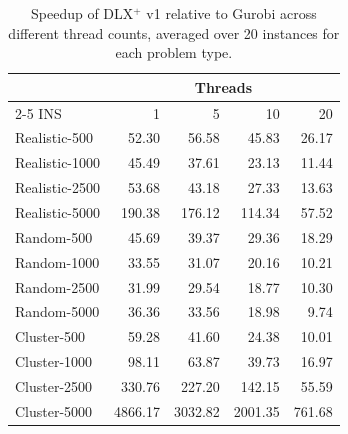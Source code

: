 \begin{table}[ht]
\centering
\caption{Speedup of DLX$^+$ v1 relative to Gurobi across different thread counts, averaged over 20 instances for each problem type.}
\label{tab:dlx_parallelisation_speedup}
\begin{tabular}{lrrrr}
\toprule
& \multicolumn{4}{c}{Threads} \\
\cmidrule(lr){2-5}
INS & 1 & 5 & 10 & 20 \\
\midrule
Realistic-500 & 52.30 & 56.58 & 45.83 & 26.17 \\
Realistic-1000 & 45.49 & 37.61 & 23.13 & 11.44 \\
Realistic-2500 & 53.68 & 43.18 & 27.33 & 13.63 \\
Realistic-5000 & 190.38 & 176.12 & 114.34 & 57.52 \\
\midrule
Random-500 & 45.69 & 39.37 & 29.36 & 18.29 \\
Random-1000 & 33.55 & 31.07 & 20.16 & 10.21 \\
Random-2500 & 31.99 & 29.54 & 18.77 & 10.30 \\
Random-5000 & 36.36 & 33.56 & 18.98 & 9.74 \\
\midrule
Cluster-500 & 59.28 & 41.60 & 24.38 & 10.01 \\
Cluster-1000 & 98.11 & 63.87 & 39.73 & 16.97 \\
Cluster-2500 & 330.76 & 227.20 & 142.15 & 55.59 \\
Cluster-5000 & 4866.17 & 3032.82 & 2001.35 & 761.68 \\
\bottomrule
\end{tabular}
\end{table}